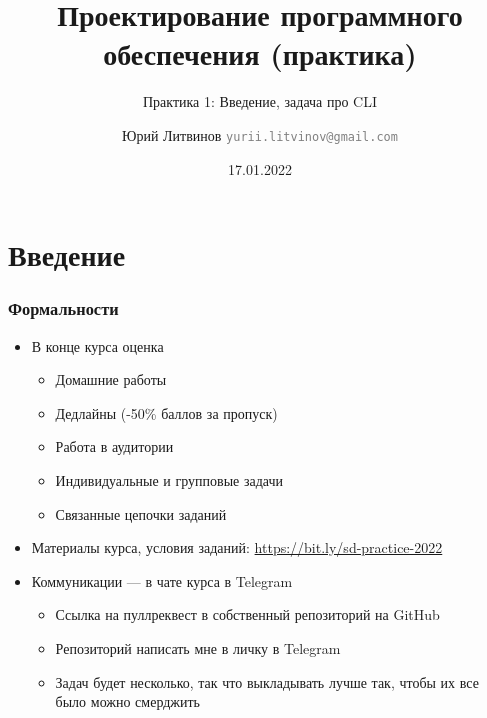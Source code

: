 \documentclass[xetex,mathserif,serif]{beamer}
\title{Проектирование программного обеспечения (практика)}
\subtitle{Практика 1: Введение, задача про CLI}
\author[Юрий Литвинов]{Юрий Литвинов \newline \textcolor{gray}{\small\texttt{yurii.litvinov@gmail.com}}}
\date{17.01.2022}
\begin{document}
    
    \frame{\titlepage}

    \section{Введение}
    
    \begin{frame}
        \frametitle{Формальности}
        \begin{itemize}
            \item В конце курса оценка
            \begin{itemize}
                \item Домашние работы
                \item Дедлайны (-50\% баллов за пропуск)
                \item Работа в аудитории
                \item Индивидуальные и групповые задачи
                \item Связанные цепочки заданий
            \end{itemize}
            \item Материалы курса, условия заданий: \url{https://bit.ly/sd-practice-2022}
            \item Коммуникации --- в чате курса в Telegram
            \begin{itemize}
                \item Ссылка на пуллреквест в собственный репозиторий на GitHub
                \item Репозиторий написать мне в личку в Telegram
                \item Задач будет несколько, так что выкладывать лучше так, чтобы их все было можно смерджить
            \end{itemize}
        \end{itemize}
    \end{frame}
\end{document}
